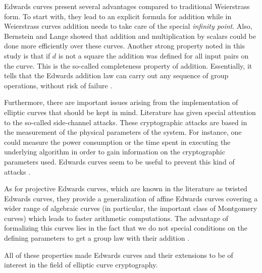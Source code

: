 Edwards curves present several advantages compared to traditional Weierstrass form. To start with, they lead to an explicit formula for addition while in Weierstrass curves addition needs to take care of the special \textit{infinity point}. Also, Bernstein and Lange \cite{bernstein2007faster} showed that addition and multiplication by scalars could be done more efficiently over these curves. Another strong property noted in this study is that if $d$ is not a square the addition was defined for all input pairs on the curve. This is the so-called completeness property of addition. Essentially, it tells that the Edwards addition law can carry out any sequence of group operations, without risk of failure \cite{bernstein2007faster}.

Furthermore, there are important issues arising from the implementation of elliptic curves that should be kept in mind. Literature has given special attention to the so-called side-channel attacks. These cryptographic attacks are based in the measurement of the physical parameters of the system. For instance, one could measure the power consumption \cite{kocher1999differential} or the time spent in executing the underlying algorithm \cite{kasper2011fast} in order to gain information on the cryptographic parameters used. Edwards curves seem to be useful to prevent this kind of attacks \cite{bernstein2007faster}.  

As for projective Edwards curves, which are known in the literature as twisted Edwards curves, they provide a generalization of affine Edwards curves covering a wider range of algebraic curves (in particular, the important class of Montgomery curves) which leads to faster arithmetic computations. The advantage of formalizing this curves lies in the fact that we do not special conditions on the defining parameters to get a group law with their addition \cite{bernstein2008twisted}. 


All of these properties made Edwards curves and their extensions to be of interest in the field of elliptic curve cryptography. 



